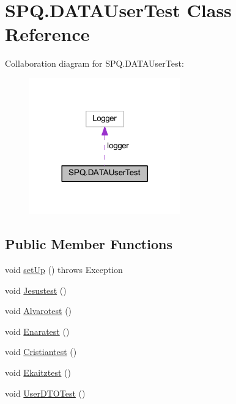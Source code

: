 \hypertarget{class_s_p_q_1_1_d_a_t_a_user_test}{}\section{S\+P\+Q.\+D\+A\+T\+A\+User\+Test Class Reference}
\label{class_s_p_q_1_1_d_a_t_a_user_test}


Collaboration diagram for S\+P\+Q.\+D\+A\+T\+A\+User\+Test\+:
\nopagebreak
\begin{figure}[H]
\begin{center}
\leavevmode
\includegraphics[width=185pt]{class_s_p_q_1_1_d_a_t_a_user_test__coll__graph}
\end{center}
\end{figure}
\subsection*{Public Member Functions}
\begin{DoxyCompactItemize}
\item 
void \mbox{\hyperlink{class_s_p_q_1_1_d_a_t_a_user_test_a703753b88018d83f5a2d3b76d335889a}{set\+Up}} ()  throws Exception 
\item 
void \mbox{\hyperlink{class_s_p_q_1_1_d_a_t_a_user_test_a29a15c9122a588e854a02c6c2fe1d203}{Jesustest}} ()
\item 
void \mbox{\hyperlink{class_s_p_q_1_1_d_a_t_a_user_test_a9d47696cb1887a6d5712f0e9beae2182}{Alvarotest}} ()
\item 
void \mbox{\hyperlink{class_s_p_q_1_1_d_a_t_a_user_test_a84d1c3d3992383e1cb93d07241cf3f02}{Enaratest}} ()
\item 
void \mbox{\hyperlink{class_s_p_q_1_1_d_a_t_a_user_test_a7defc94d9391e6721dee5c627f75e1fb}{Cristiantest}} ()
\item 
void \mbox{\hyperlink{class_s_p_q_1_1_d_a_t_a_user_test_a04242b7156b6bb7828bd569de8027fad}{Ekaitztest}} ()
\item 
void \mbox{\hyperlink{class_s_p_q_1_1_d_a_t_a_user_test_a4feb113d2b2971c37851e1b6bddca741}{User\+D\+T\+O\+Test}} ()
\end{DoxyCompactItemize}


